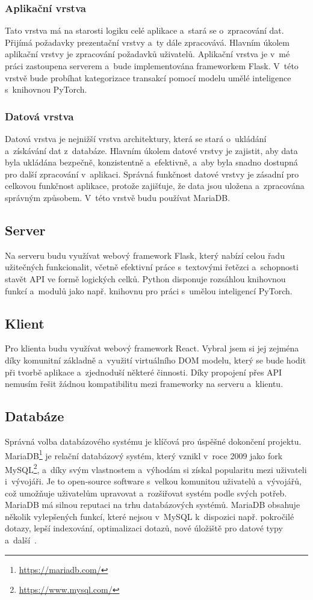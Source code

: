 \subsubsection{Aplikační vrstva}
Tato vrstva má na starosti logiku celé aplikace a~stará se o~zpracování dat. Přijímá požadavky prezentační vrstvy a~ty dále zpracovává. Hlavním úkolem aplikační vrstvy je zpracování požadavků uživatelů. Aplikační vrstva je v~mé práci zastoupena serverem a~bude implementována frameworkem Flask. V~této vrstvě bude probíhat kategorizace transakcí pomocí modelu umělé inteligence s~knihovnou PyTorch.
\subsubsection{Datová vrstva}
Datová vrstva je nejnižší vrstva architektury, která se stará o~ukládání a~získávání dat z~databáze. Hlavním úkolem datové vrstvy je zajistit, aby data byla ukládána bezpečně, konzistentně a~efektivně, a~aby byla snadno dostupná pro další zpracování v~aplikaci. Správná funkčnost datové vrstvy je zásadní pro celkovou funkčnost aplikace, protože zajišťuje, že data jsou uložena a~zpracována správným způsobem. V~této vrstvě budu používat MariaDB.
\subsection{Server}
Na serveru budu využívat webový framework Flask, který nabízí celou řadu užitečných funkcionalit, včetně efektivní práce s~textovými řetězci a~schopnosti stavět API ve formě logických celků. Python disponuje rozsáhlou knihovnou funkcí a~modulů jako např. knihovnu pro práci s~umělou inteligencí PyTorch.
\subsection{Klient}
Pro klienta budu využívat webový framework React. Vybral jsem si jej zejména díky komunitní základně a~využití virtuálního DOM modelu, který se bude hodit při tvorbě aplikace a~zjednoduší některé činnosti. Díky propojení přes API nemusím řešit žádnou kompatibilitu mezi frameworky na serveru a~klientu.
\subsection{Databáze}
Správná volba databázového systému je klíčová pro úspěšné dokončení projektu. MariaDB\footnote{\url{https://mariadb.com/}} je relační databázový systém, který vznikl v~roce 2009 jako fork MySQL\footnote{\url{https://www.mysql.com/}}, a~díky svým vlastnostem a~výhodám si získal popularitu mezi uživateli i~vývojáři. Je to open-source software s~velkou komunitou uživatelů a~vývojářů, což umožňuje uživatelům upravovat a~rozšiřovat systém podle svých potřeb. MariaDB má silnou reputaci na trhu databázových systémů. MariaDB obsahuje několik vylepšených funkcí, které nejsou v~MySQL k~dispozici např. pokročilé dotazy, lepší indexování, optimalizaci dotazů, nové úložiště pro datové typy a~další~\cite{mariadb}.

